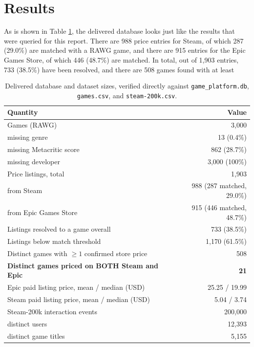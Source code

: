 \documentclass[fleqn,10pt]{wlscirep}
\begin{document}
\section*{Results}

As is shown in Table \ref{tab:pipeline-summary}, the delivered database looks just like the results that were queried for this report. There are 988 price entries for Steam, of which 287 (29.0\%) are matched with a RAWG game, and there are 915 entries for the Epic Games Store, of which 446 (48.7\%) are matched. In total, out of 1,903 entries, 733 (38.5\%) have been resolved, and there are 508 games found with at least

\begin{table}[H]
\centering
\begin{tabular}{lr}
\toprule
Quantity & Value \\
\midrule
Games (RAWG) & 3{,}000 \\
\quad missing genre & 13 (0.4\%) \\
\quad missing Metacritic score & 862 (28.7\%) \\
\quad missing developer & 3{,}000 (100\%) \\
Price listings, total & 1{,}903 \\
\quad from Steam & 988 (287 matched, 29.0\%) \\
\quad from Epic Games Store & 915 (446 matched, 48.7\%) \\
Listings resolved to a game overall & 733 (38.5\%) \\
Listings below match threshold & 1{,}170 (61.5\%) \\
Distinct games with $\geq 1$ confirmed store price & 508 \\
\textbf{Distinct games priced on BOTH Steam and Epic} & \textbf{21} \\
Epic paid listing price, mean / median (USD) & 25.25 / 19.99 \\
Steam paid listing price, mean / median (USD) & 5.04 / 3.74 \\
Steam-200k interaction events & 200{,}000 \\
\quad distinct users & 12{,}393 \\
\quad distinct game titles & 5{,}155 \\
\bottomrule
\end{tabular}
\caption{\label{tab:pipeline-summary}Delivered database and dataset sizes, verified directly against \texttt{game\_platform.db}, \texttt{games.csv}, and \texttt{steam-200k.csv}.}
\end{table}
\end{document}
